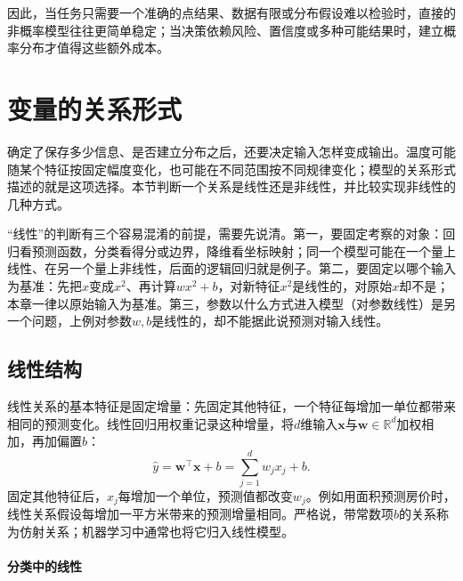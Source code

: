 因此，当任务只需要一个准确的点结果、数据有限或分布假设难以检验时，直接的非概率模型往往更简单稳定；当决策依赖风险、置信度或多种可能结果时，建立概率分布才值得这些额外成本。

\section{变量的关系形式}
\label{sec:models-structure}

确定了保存多少信息、是否建立分布之后，还要决定输入怎样变成输出。温度可能随某个特征按固定幅度变化，也可能在不同范围按不同规律变化；模型的关系形式描述的就是这项选择。本节判断一个关系是线性还是非线性，并比较实现非线性的几种方式。

“线性”的判断有三个容易混淆的前提，需要先说清。第一，要固定考察的对象：回归看预测函数，分类看得分或边界，降维看坐标映射；同一个模型可能在一个量上线性、在另一个量上非线性，后面的逻辑回归就是例子。第二，要固定以哪个输入为基准：先把$x$变成$x^2$、再计算$wx^2+b$，对新特征$x^2$是线性的，对原始$x$却不是；本章一律以原始输入为基准。第三，参数以什么方式进入模型（对参数线性）是另一个问题，上例对参数$w,b$是线性的，却不能据此说预测对输入线性。

\subsection{线性结构}
\label{sec:models-linear}

线性关系的基本特征是固定增量：先固定其他特征，一个特征每增加一单位都带来相同的预测变化。线性回归用权重记录这种增量，将$d$维输入$\bm{x}$与$\bm{w}\in\mathbb{R}^{d}$加权相加，再加偏置$b$：
\begin{equation}
  \hat{y}=\bm{w}^{\top}\bm{x}+b
  =\sum_{j=1}^{d}w_jx_j+b.
  \label{eq:models-linear-score}
\end{equation}
固定其他特征后，$x_j$每增加一个单位，预测值都改变$w_j$。例如用面积预测房价时，线性关系假设每增加一平方米带来的预测增量相同。严格说，带常数项$b$的关系称为仿射关系；机器学习中通常也将它归入线性模型。

\paragraph{分类中的线性}

